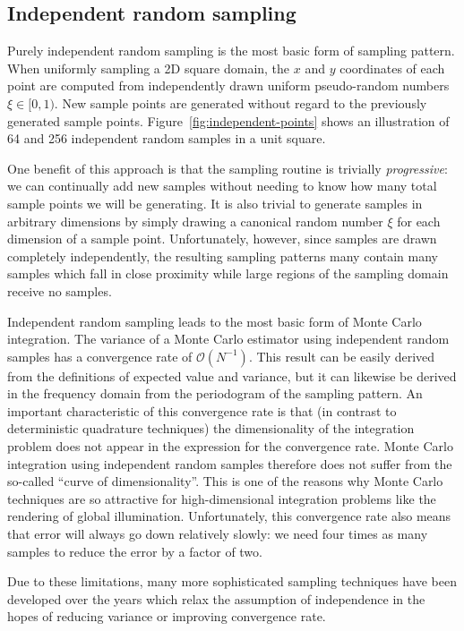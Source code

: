 \documentclass[11pt,fleqn]{book} %
\begin{document}
\subsection{Independent random sampling}
Purely independent random sampling is the most basic form of sampling pattern. When uniformly sampling a 2D square domain, the $x$ and $y$ coordinates of each point are computed from independently drawn uniform pseudo-random numbers $\xi \in [0,1)$. New sample points are generated without regard to the previously generated sample points. Figure~\ref{fig:independent-points} shows an illustration of 64 and 256 independent random samples in a unit square.

One benefit of this approach is that the sampling routine is trivially \textit{progressive}: we can continually add new samples without needing to know how many total sample points we will be generating. It is also trivial to generate samples in arbitrary dimensions by simply drawing a canonical random number $\xi$ for each dimension of a sample point. Unfortunately, however, since samples are drawn completely independently, the resulting sampling patterns many contain many samples which fall in close proximity while large regions of the sampling domain receive no samples.

Independent random sampling leads to the most basic form of Monte Carlo integration. The variance of a Monte Carlo estimator using independent random samples has a convergence rate of $\mathcal{O}(N^{-1})$. This result can be easily derived from the definitions of expected value and variance, but it can likewise be derived in the frequency domain from the periodogram of the sampling pattern. An important characteristic of this convergence rate is that (in contrast to deterministic quadrature techniques) the dimensionality of the integration problem does not appear in the expression for the convergence rate. Monte Carlo integration using independent random samples therefore does not suffer from the so-called ``curve of dimensionality''. This is one of the reasons why Monte Carlo techniques are so attractive for high-dimensional integration problems like the rendering of global illumination. Unfortunately, this convergence rate also means that error will always go down relatively slowly: we need four times as many samples to reduce the error by a factor of two.

Due to these limitations, many more sophisticated sampling techniques have been developed over the years which relax the assumption of independence in the hopes of reducing variance or improving convergence rate.
\end{document}
